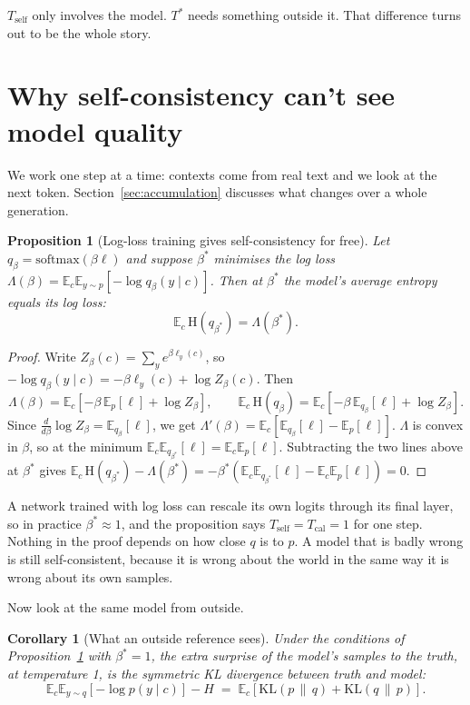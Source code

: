 \documentclass[10pt]{article}
\newtheorem{proposition}{Proposition}
\newtheorem{corollary}{Corollary}
\newcommand{\E}{\mathbb{E}}
\newcommand{\KL}{\mathrm{KL}}
\newcommand{\Ts}{T^{*}}
\begin{document}
$T_{\text{self}}$ only involves the model. $\Ts$ needs something outside it. That difference turns out to be the whole story.

\section{Why self-consistency can't see model quality}
\label{sec:theory}

We work one step at a time: contexts come from real text and we look at the next token. Section~\ref{sec:accumulation} discusses what changes over a whole generation.

\begin{proposition}[Log-loss training gives self-consistency for free]
\label{prop:self}
Let $q_\beta = \mathrm{softmax}(\beta \ell)$ and suppose $\beta^{*}$ minimises the log loss $\Lambda(\beta) = \E_c \E_{y\sim p}[-\log q_\beta(y \mid c)]$. Then at $\beta^{*}$ the model's average entropy equals its log loss:
\[
\E_c\, \mathrm{H}(q_{\beta^{*}}) = \Lambda(\beta^{*}).
\]
\end{proposition}

\begin{proof}
Write $Z_\beta(c) = \sum_y e^{\beta \ell_y(c)}$, so $-\log q_\beta(y \mid c) = -\beta \ell_y(c) + \log Z_\beta(c)$. Then
\[
\Lambda(\beta) = \E_c\!\left[-\beta\, \E_{p}[\ell] + \log Z_\beta\right], \qquad
\E_c\, \mathrm{H}(q_\beta) = \E_c\!\left[-\beta\, \E_{q_\beta}[\ell] + \log Z_\beta\right].
\]
Since $\tfrac{d}{d\beta} \log Z_\beta = \E_{q_\beta}[\ell]$, we get $\Lambda'(\beta) = \E_c[\E_{q_\beta}[\ell] - \E_p[\ell]]$. $\Lambda$ is convex in $\beta$, so at the minimum $\E_c \E_{q_{\beta^*}}[\ell] = \E_c \E_p[\ell]$. Subtracting the two lines above at $\beta^*$ gives $\E_c\, \mathrm{H}(q_{\beta^*}) - \Lambda(\beta^*) = -\beta^*\left(\E_c\E_{q_{\beta^*}}[\ell] - \E_c\E_p[\ell]\right) = 0$.
\end{proof}

A network trained with log loss can rescale its own logits through its final layer, so in practice $\beta^* \approx 1$, and the proposition says $T_{\text{self}} = T_{\text{cal}} = 1$ for one step. Nothing in the proof depends on how close $q$ is to $p$. A model that is badly wrong is still self-consistent, because it is wrong about the world in the same way it is wrong about its own samples.

Now look at the same model from outside.

\begin{corollary}[What an outside reference sees]
\label{cor:jeffreys}
Under the conditions of Proposition~\ref{prop:self} with $\beta^* = 1$, the extra surprise of the model's samples to the truth, at temperature 1, is the symmetric KL divergence between truth and model:
\[
\E_c \E_{y\sim q}[-\log p(y \mid c)] - H \;=\; \E_c\left[\KL(p \,\|\, q) + \KL(q \,\|\, p)\right].
\]
\end{corollary}
\end{document}

